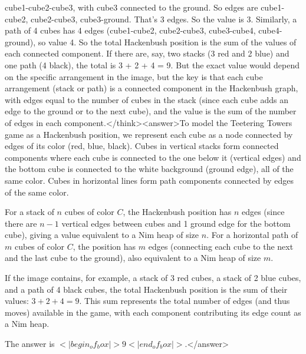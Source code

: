 cube1-cube2-cube3, with cube3 connected to the ground. So edges are cube1-cube2, cube2-cube3, cube3-ground. That's 3 edges. So the value is 3. Similarly, a path of 4 cubes has 4 edges (cube1-cube2, cube2-cube3, cube3-cube4, cube4-ground), so value 4. So the total Hackenbush position is the sum of the values of each connected component. If there are, say, two stacks (3 red and 2 blue) and one path (4 black), the total is 3 + 2 + 4 = 9. But the exact value would depend on the specific arrangement in the image, but the key is that each cube arrangement (stack or path) is a connected component in the Hackenbush graph, with edges equal to the number of cubes in the stack (since each cube adds an edge to the ground or to the next cube), and the value is the sum of the number of edges in each component.</think><answer>To model the Teetering Towers game as a Hackenbush position, we represent each cube as a node connected by edges of its color (red, blue, black). Cubes in vertical stacks form connected components where each cube is connected to the one below it (vertical edges) and the bottom cube is connected to the white background (ground edge), all of the same color. Cubes in horizontal lines form path components connected by edges of the same color.  

For a stack of \( n \) cubes of color \( C \), the Hackenbush position has \( n \) edges (since there are \( n-1 \) vertical edges between cubes and 1 ground edge for the bottom cube), giving a value equivalent to a Nim heap of size \( n \). For a horizontal path of \( m \) cubes of color \( C \), the position has \( m \) edges (connecting each cube to the next and the last cube to the ground), also equivalent to a Nim heap of size \( m \).  

If the image contains, for example, a stack of 3 red cubes, a stack of 2 blue cubes, and a path of 4 black cubes, the total Hackenbush position is the sum of their values: \( 3 + 2 + 4 = 9 \). This sum represents the total number of edges (and thus moves) available in the game, with each component contributing its edge count as a Nim heap.  

The answer is \(<|begin_of_box|>9<|end_of_box|>\).</answer>